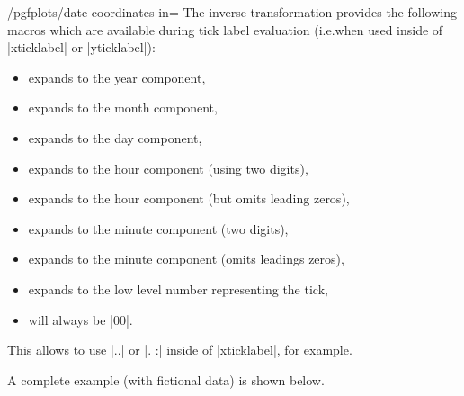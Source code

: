 {\begin{stylekey}{/pgfplots/date coordinates in=}
    The inverse transformation provides the following macros which are
    available during tick label evaluation (i.e.\@ when used inside of
    |xticklabel| or |yticklabel|):
    \begin{itemize}
        \item \declareandlabel{\year} expands to the year component,
        \item \declareandlabel{\month} expands to the month component,
        \item \declareandlabel{\day} expands to the day component,
        \item \declareandlabel{\hour} expands to the hour component (using
            two digits),
        \item \declareandlabel{\Hour} expands to the hour component (but
            omits leading zeros),
        \item \declareandlabel{\minute} expands to the minute component (two
            digits),
        \item \declareandlabel{\Minute} expands to the minute component
            (omits leadings zeros),
        \item \declareandlabel{\lowlevel} expands to the low level number
            representing the tick,
        \item \declareandlabel{\second} will always be |00|.
    \end{itemize}
    This allows to use |\day.\month.\year| or |\day. \hour:\minute| inside of
    |xticklabel|, for example.

    A complete example (with fictional data) is shown below.
\begin{codeexample}[pre={\begin{lateximage}},post={\end{lateximage}}]


\end{codeexample}


\end{stylekey}}
